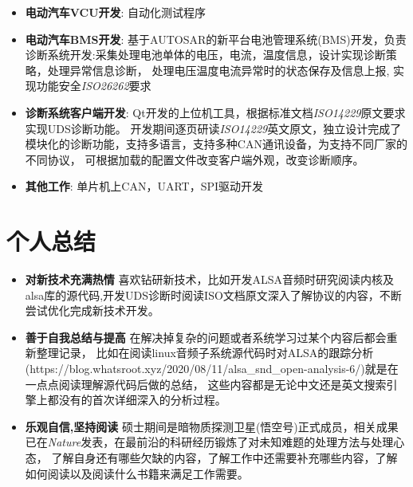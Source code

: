 \documentclass{resume}
\begin{document}
\begin{itemize}[parsep=0.2ex]
  \item \textbf{电动汽车VCU开发}: 自动化测试程序
\end{itemize}

\begin{itemize}[parsep=0.2ex]
    \item \textbf{电动汽车BMS开发}: \newline
    基于AUTOSAR的新平台电池管理系统(BMS)开发，负责诊断系统开发:采集处理电池单体的电压，电流，温度信息，设计实现诊断策略，处理异常信息诊断，
    处理电压温度电流异常时的状态保存及信息上报, 实现功能安全\emph{ISO26262}要求
  \item \textbf{诊断系统客户端开发}: \newline
    Qt开发的上位机工具，根据标准文档\emph{ISO14229}原文要求实现UDS诊断功能。
    开发期间逐页研读\emph{ISO14229}英文原文，独立设计完成了模块化的诊断功能，支持多语言，支持多种CAN通讯设备，为支持不同厂家的不同协议，
    可根据加载的配置文件改变客户端外观，改变诊断顺序。
  \item \textbf{其他工作}: \newline
    单片机上CAN，UART，SPI驱动开发
\end{itemize}

\section{个人总结}
\begin{itemize}[parsep=0.2ex]
  \item \textbf{对新技术充满热情}\newline
    喜欢钻研新技术，比如开发ALSA音频时研究阅读内核及alsa库的源代码,开发UDS诊断时阅读ISO文档原文深入了解协议的内容，不断尝试优化完成新技术开发。
  \item \textbf{善于自我总结与提高}\newline
    在解决掉复杂的问题或者系统学习过某个内容后都会重新整理记录，
比如在阅读linux音频子系统源代码时对ALSA的跟踪分析(https://blog.whatsroot.xyz/2020/08/11/alsa\_snd\_open-analysis-6/)就是在一点点阅读理解源代码后做的总结，
这些内容都是无论中文还是英文搜索引擎上都没有的首次详细深入的分析过程。
  \item \textbf{乐观自信,坚持阅读}\newline
    硕士期间是暗物质探测卫星(悟空号)正式成员，相关成果已在\emph{Nature}发表，在最前沿的科研经历锻炼了对未知难题的处理方法与处理心态，
    了解自身还有哪些欠缺的内容，了解工作中还需要补充哪些内容，了解如何阅读以及阅读什么书籍来满足工作需要。
\end{itemize}
\end{document}
